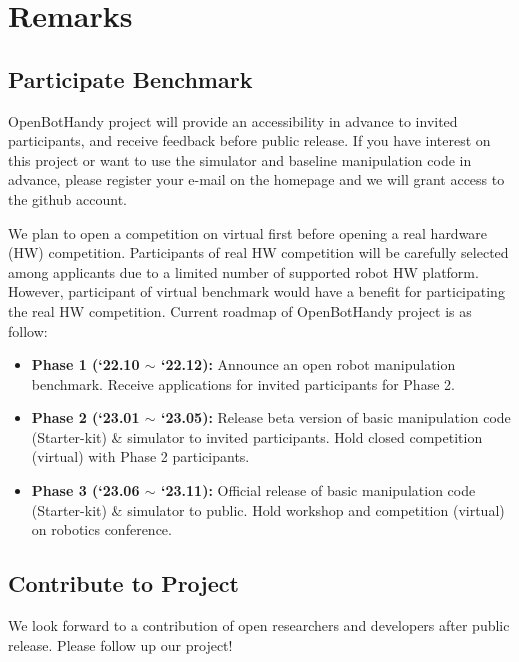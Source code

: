 \chapter{Remarks}
\label{chap:remarks}

\section{Participate Benchmark}

OpenBotHandy project will provide an accessibility in advance to invited participants, and receive feedback before public release.
If you have interest on this project or want to use the simulator and baseline manipulation code in advance,
please register your e-mail on the homepage and we will grant access to the github account.

We plan to open a competition on virtual first before opening a real hardware (HW) competition.
Participants of real HW competition will be carefully selected among applicants due to a limited number of supported robot HW platform.
However, participant of virtual benchmark would have a benefit for participating the real HW competition.
Current roadmap of OpenBotHandy project is as follow:
\begin{itemize}
\item
\textbf{Phase 1 (`22.10 $\sim$ `22.12):}
Announce an open robot manipulation benchmark. Receive applications for invited participants for Phase 2.
\item
\textbf{Phase 2 (`23.01 $\sim$ `23.05):}
Release beta version of basic manipulation code (Starter-kit) \& simulator to invited participants.
Hold closed competition (virtual) with Phase 2 participants.
\item
\textbf{Phase 3 (`23.06 $\sim$ `23.11):}
Official release of basic manipulation code (Starter-kit) \& simulator to public.
Hold workshop and competition (virtual) on robotics conference.
\end{itemize}


\section{Contribute to Project}

We look forward to a contribution of open researchers and developers after public release.
Please follow up our project!